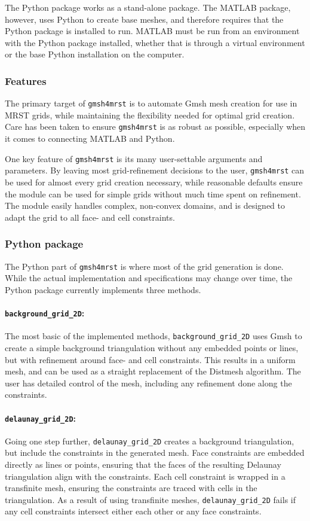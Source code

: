 The Python package works as a stand-alone package. The MATLAB package, however, uses Python to create base meshes, and therefore requires that the Python package is installed to run. MATLAB must be run from an environment with the Python package installed, whether that is through a virtual environment or the base Python installation on the computer.


\subsubsection{Features}
The primary target of \verb|gmsh4mrst| is to automate Gmsh mesh creation for use in MRST grids, while maintaining the flexibility needed for optimal grid creation. Care has been taken to ensure \verb|gmsh4mrst| is as robust as possible, especially when it comes to connecting MATLAB and Python.

One key feature of \verb|gmsh4mrst| is its many user-settable arguments and parameters. By leaving most grid-refinement decisions to the user, \verb|gmsh4mrst| can be used for almost every grid creation necessary, while reasonable defaults ensure the module can be used for simple grids without much time spent on refinement. The module easily handles complex, non-convex domains, and is designed to adapt the grid to all face- and cell constraints.

\subsubsection{Python package}
The Python part of \verb|gmsh4mrst| is where most of the grid generation is done. While the actual implementation and specifications may change over time, the Python package currently implements three methods.

\paragraph{\texttt{background\_grid\_2D}:}
The most basic of the implemented methods, \verb|background_grid_2D| uses Gmsh to create a simple background triangulation without any embedded points or lines, but with refinement around face- and cell constraints. This results in a uniform mesh, and can be used as a straight replacement of the Distmesh algorithm. The user has detailed control of the mesh, including any refinement done along the constraints.

\paragraph{\texttt{delaunay\_grid\_2D}:}
Going one step further, \verb|delaunay_grid_2D| creates a background triangulation, but include the constraints in the generated mesh. Face constraints are embedded directly as lines or points, ensuring that the faces of the resulting Delaunay triangulation align with the constraints. Each cell constraint is wrapped in a transfinite mesh, ensuring the constraints are traced with cells in the triangulation. As a result of using transfinite meshes, \verb|delaunay_grid_2D| fails if any cell constraints intersect either each other or any face constraints.

